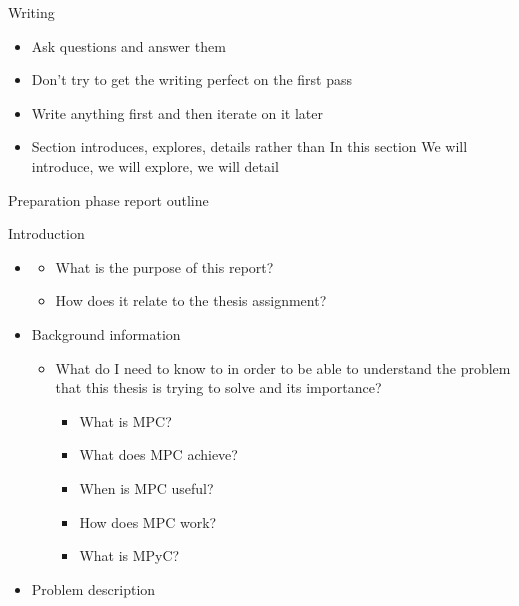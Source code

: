 \hypertarget{notes__04000-writing.md}{}
\begin{frame}{Writing}
\protect\hypertarget{notes__04000-writing.md__writing}{}
\begin{itemize}
\item
  Ask questions and answer them
\item
  Don't try to get the writing perfect on the first pass
\item
  Write anything first and then iterate on it later
\item
  Section introduces, explores, details rather than In this section We
  will introduce, we will explore, we will detail
\end{itemize}
\end{frame}

\hypertarget{notes__05000-prep.md}{}
\begin{frame}{Preparation phase report outline}
\protect\hypertarget{notes__05000-prep.md__preparation-phase-report-outline}{}
\begin{block}{Introduction}
\protect\hypertarget{notes__05000-prep.md__introduction}{}
\begin{itemize}
\item
  \begin{itemize}
  \tightlist
  \item
    What is the purpose of this report?
  \item
    How does it relate to the thesis assignment?
  \end{itemize}
\item
  Background information

  \begin{itemize}
  \tightlist
  \item
    What do I need to know to in order to be able to understand the
    problem that this thesis is trying to solve and its importance?

    \begin{itemize}
    \tightlist
    \item
      What is MPC?
    \item
      What does MPC achieve?
    \item
      When is MPC useful?
    \item
      How does MPC work?
    \item
      What is MPyC?
    \end{itemize}
  \end{itemize}
\item
  Problem description


\end{itemize}
\end{block}
\end{frame}
